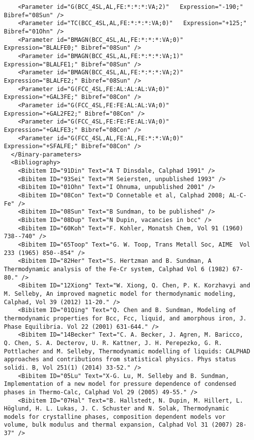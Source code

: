 \documentclass[12pt]{article}
\begin{document}
\begin{appendices}
{\begin{verbatim}
    <Parameter id="G(BCC_4SL,AL,FE:*:*:*:VA;2)"   Expression="-190;" Bibref="08Sun" />
    <Parameter id="TC(BCC_4SL,AL,FE:*:*:*:VA;0)"   Expression="+125;" Bibref="01Ohn" />
    <Parameter id="BMAGN(BCC_4SL,AL,FE:*:*:*:VA;0)"   Expression="BLALFE0;" Bibref="08Sun" />
    <Parameter id="BMAGN(BCC_4SL,AL,FE:*:*:*:VA;1)"   Expression="BLALFE1;" Bibref="08Sun" />
    <Parameter id="BMAGN(BCC_4SL,AL,FE:*:*:*:VA;2)"   Expression="BLALFE2;" Bibref="08Sun" />
    <Parameter id="G(FCC_4SL,FE:AL:AL:AL:VA;0)"   Expression="+GAL3FE;" Bibref="08Con" />
    <Parameter id="G(FCC_4SL,FE:FE:AL:AL:VA;0)"   Expression="+GAL2FE2;" Bibref="08Con" />
    <Parameter id="G(FCC_4SL,FE:FE:FE:AL:VA;0)"   Expression="+GALFE3;" Bibref="08Con" />
    <Parameter id="G(FCC_4SL,AL,FE:AL,FE:*:*:VA;0)"   Expression="+SFALFE;" Bibref="08Con" />
  </Binary-parameters>
  <Bibliography>
    <Bibitem ID="91Din" Text="A T Dinsdale, Calphad 1991" />
    <Bibitem ID="93Sei" Text="M Seiersten, unpublished 1993" />
    <Bibitem ID="01Ohn" Text="I Ohnuma, unpublished 2001" />
    <Bibitem ID="08Con" Text="D Connetable et al, Calphad 2008; AL-C-Fe" />
    <Bibitem ID="08Sun" Text="B Sundman, to be published" />
    <Bibitem ID="08Dup" Text="N Dupin, vacancies in bcc" />
    <Bibitem ID="60Koh" Text="F. Kohler, Monatsh Chem, Vol 91 (1960) 738--740" />
    <Bibitem ID="65Toop" Text="G. W. Toop, Trans Metall Soc, AIME  Vol 233 (1965) 850--854" />
    <Bibitem ID="82Her" Text="S. Hertzman and B. Sundman, A Thermodynamic analysis of the Fe-Cr system, Calphad Vol 6 (1982) 67-80." />
    <Bibitem ID="12Xiong" Text="W. Xiong, Q. Chen, P. K. Korzhavyi and M. Selleby, An improved magnetic model for thermodynamic modeling, Calphad, Vol 39 (2012) 11-20." />
    <Bibitem ID="01Qing" Text="Q. Chen and B. Sundman, Modeling of thermodynamic properties for Bcc, Fcc, liquid, and amorphous iron, J. Phase Equilibria. Vol 22 (2001) 631-644." />
    <Bibitem ID="14Becker" Text="C. A. Becker, J. Agren, M. Baricco, Q. Chen, S. A. Decterov, U. R. Kattner, J. H. Perepezko, G. R. Pottlacher and M. Selleby, Thermodynamic modelling of liquids: CALPHAD approaches and contributions from statistical physics. Phys status solidi. B, Vol 251(1) (2014) 33-52." />
    <Bibitem ID="05Lu" Text="X-G. Lu, M. Selleby and B. Sundman, Implementation of a new model for pressure dependence of condensed phases in Thermo-Calc, Calphad Vol 29 (2005) 49-55." />
    <Bibitem ID="07Hal" Text="B. Hallstedt, N. Dupin, M. Hillert, L. Höglund, H. L. Lukas, J. C. Schuster and N. Solak, Thermodynamic models for crystalline phases, composition dependent models vor volume, bulk modulus and thermal expansion, Calphad Vol 31 (2007) 28-37" />

\end{verbatim}}
\end{appendices}
\end{document}
